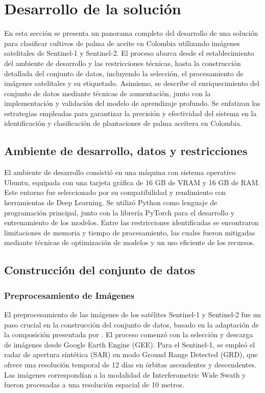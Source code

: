 \section{Desarrollo de la solución}

En esta sección se presenta un panorama completo del desarrollo de una solución para clasificar cultivos de palma de aceite en Colombia utilizando imágenes satelitales de Sentinel-1 y Sentinel-2. El proceso abarca desde el establecimiento del ambiente de desarrollo y las restricciones técnicas, hasta la construcción detallada del conjunto de datos, incluyendo la selección, el procesamiento de imágenes satelitales y su etiquetado. Asimismo, se describe el enriquecimiento del conjunto de datos mediante técnicas de aumentación, junto con la implementación y validación del modelo de aprendizaje profundo. Se enfatizan las estrategias empleadas para garantizar la precisión y efectividad del sistema en la identificación y clasificación de plantaciones de palma aceitera en Colombia.

\subsection{Ambiente de desarrollo, datos y restricciones}

El ambiente de desarrollo consistió en una máquina con sistema operativo Ubuntu, equipada con una tarjeta gráfica de 16 GB de VRAM y 16 GB de RAM. Este entorno fue seleccionado por su compatibilidad y rendimiento con herramientas de Deep Learning. Se utilizó Python como lenguaje de programación principal, junto con la librería PyTorch para el desarrollo y entrenamiento de los modelos. Entre las restricciones identificadas se encontraron limitaciones de memoria y tiempo de procesamiento, las cuales fueron mitigadas mediante técnicas de optimización de modelos y un uso eficiente de los recursos.

\subsection{Construcción del conjunto de datos}

\subsubsection{Preprocesamiento de Imágenes}

El preprocesamiento de las imágenes de los satélites Sentinel-1 y Sentinel-2 fue un paso crucial en la construcción del conjunto de datos, basado en la adaptación de la composición presentada por \cite{descals2021}. El proceso comenzó con la selección y descarga de imágenes desde Google Earth Engine (GEE). Para el Sentinel-1, se empleó el radar de apertura sintética (SAR) en modo Ground Range Detected (GRD), que ofrece una resolución temporal de 12 días en órbitas ascendentes y descendentes. Las imágenes correspondían a la modalidad de Interferometric Wide Swath y fueron procesadas a una resolución espacial de 10 metros. 

